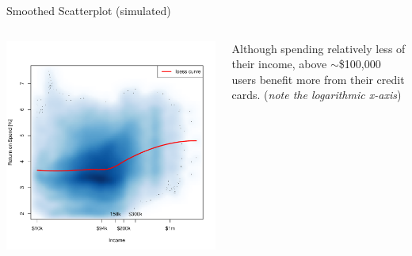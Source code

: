 \begin{frame}{Smoothed Scatterplot (simulated)}
    \begin{columns}[c]
        \begin{column}{0.7\textwidth}
            \includegraphics[width=0.9\textheight]{../Figures/MC_ROS_vs_Income.pdf}
        \end{column}
        \begin{column}{0.3\textwidth}
            \centering
            Although spending relatively less of their income, above $\sim$\$100,000 users benefit more from their credit cards.
            \vskip16pt
            (\emph{note the logarithmic x-axis})
        \end{column}
    \end{columns}
\end{frame} 


